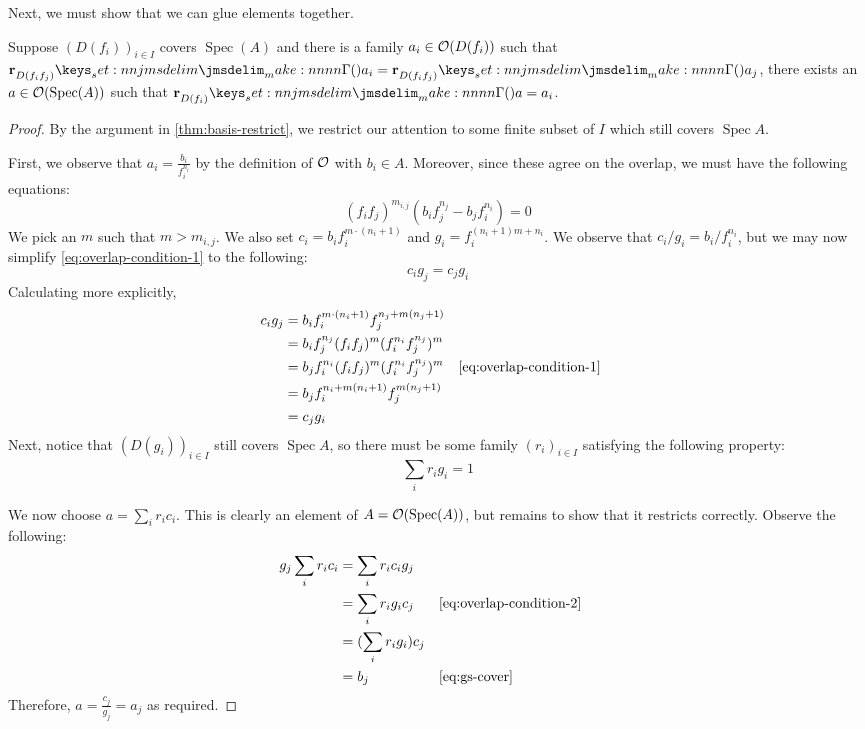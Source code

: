 \documentclass{amsart}
\DeclareMathOperator{\Spec}{Spec}
\begin{document}
Next, we must show that we can glue elements together.
\begin{theorem}
  \label{thm:basis-glue}
  Suppose $(D(f_i))_{i \in I}$ covers $\Spec(A)$ and there is a family $a_i \in \mathcal{O}(D(f_i))$
  such that $\Res{a_i}{D(f_if_j)} = \Res{a_j}{D(f_if_j)}$, there exists an
  $a \in \StructSh(\Spec(A))$ such that $\Res{a}{D(f_i)} = a_i$.
\end{theorem}
\begin{proof}
  By the argument in \cref{thm:basis-restrict}, we restrict our attention to some finite subset of
  $I$ which still covers $\Spec A$.

  First, we observe that $a_i = \frac{b_i}{f_i^{n_i}}$ by the definition of $\mathcal{O}$ with
  $b_i \in A$. Moreover, since these agree on the overlap, we must have the following equations:
  \begin{equation}
    \label{eq:overlap-condition-1}
    (f_if_j)^{m_{i,j}}(b_if_j^{n_j} - b_jf_i^{n_i}) = 0
  \end{equation}
  We pick an $m$ such that $m > m_{i,j}$. We also set $c_i = b_if_i^{m \cdot (n_i + 1)}$ and
  $g_i = f_i^{(n_i + 1)m + n_i}$. We observe that $c_i/g_i = b_i/f_i^{n_i}$, but we may now simplify
  \cref{eq:overlap-condition-1} to the following:
  \begin{equation}
    \label{eq:overlap-condition-2}
    c_ig_j = c_jg_i
  \end{equation}
  Calculating more explicitly,
  \begin{align*}
    c_ig_j
    &= b_if_i^{m \cdot (n_i + 1)}f_j^{n_j + m(n_j + 1)}\\
    &= b_if_j^{n_j} (f_if_j)^{m}(f_i^{n_i}f_j^{n_j})^m\\
    &= b_jf_i^{n_i} (f_if_j)^{m}(f_i^{n_i}f_j^{n_j})^m && \text{\cref{eq:overlap-condition-1}}\\
    &= b_jf_i^{n_i + m(n_i + 1)}f_j^{m(n_j + 1)}\\
    &= c_j g_i
  \end{align*}
  Next, notice that $(D(g_i))_{i \in I}$ still covers $\Spec A$, so there must be some family
  $(r_i)_{i \in I}$ satisfying the following property:
  \begin{equation}
    \label{eq:gs-cover}
    \sum_i r_ig_i = 1
  \end{equation}

  We now choose $a = \sum_i r_ic_i$. This is clearly an element of $A = \StructSh(\Spec(A))$, but
  remains to show that it restricts correctly. Observe the following:
  \begin{align*}
    g_j \sum_i r_ic_i
    &= \sum_i r_i c_ig_j\\
    &= \sum_i r_i g_i c_j && \text{\cref{eq:overlap-condition-2}}\\
    &= (\sum_i r_i g_i) c_j\\
    &= b_j && \text{\cref{eq:gs-cover}}
  \end{align*}
  Therefore, $a = \frac{c_j}{g_j} = a_j$ as required.
\end{proof}
\end{document}
